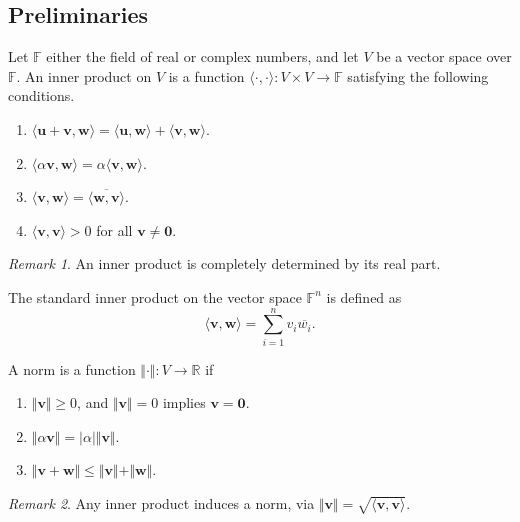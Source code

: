 \documentclass[11pt]{article}
\newcommand{\R}{\mathbb{R}}
\newcommand{\F}{\mathbb{F}}
\renewcommand{\vec}[1]{\boldsymbol{#1}}
\newcommand{\vu}{\vec{u}}
\newcommand{\vv}{\vec{v}}
\newcommand{\vw}{\vec{w}}
\newcommand{\ip}[2]{\langle #1, #2 \rangle}
\newcommand{\norm}[1]{\Vert #1 \Vert}
\theoremstyle{definition}
\theoremstyle{remark}
\newtheorem*{remark}{Remark}
\numberwithin{equation}{section}
\begin{document}
    \subsection{Preliminaries}
    \begin{definition}
        Let $\F$ either the field of real or complex numbers, and let $V$ be a vector
        space over $\F$. An inner product on $V$ is a function
        $\ip{\cdot}{\cdot}\colon V \times V \to \F$ satisfying the following
        conditions. \begin{enumerate}
            \itemsep0em
            \item $\ip{\vu + \vv}{\vw} = \ip{\vu}{\vw} + \ip{\vv}{\vw}$.
            \item $\ip{\alpha\vv}{\vw} = \alpha\ip{\vv}{\vw}$.
            \item $\ip{\vv}{\vw} = \overline{\ip{\vw}{\vv}}$.
            \item $\ip{\vv}{\vv} > 0$ for all $\vv \neq \vec{0}$.
        \end{enumerate}
        \begin{remark}
            An inner product is completely determined by its real part.
        \end{remark}
    \end{definition}

    \begin{definition}
        The standard inner product on the vector space $\F^n$ is defined as \[
            \ip{\vv}{\vw} = \sum_{i = 1}^n v_i\overline{w_i}.
        \] 
    \end{definition}

    \begin{definition}
        A norm is a function $\norm{\cdot}\colon V \to \R$ if \begin{enumerate}
            \itemsep0em
            \item $\norm{\vv} \geq 0$, and $\norm{\vv} = 0$ implies $\vv = \vec{0}$.
            \item $\norm{\alpha\vv} = |\alpha|\norm{\vv}$.
            \item $\norm{\vv + \vw} \leq \norm{\vv} + \norm{\vw}$.
        \end{enumerate}
        \begin{remark}
            Any inner product induces a norm, via $\norm{\vv} =
            \sqrt{\ip{\vv}{\vv}}$.
        \end{remark}
    \end{definition}
\end{document}

